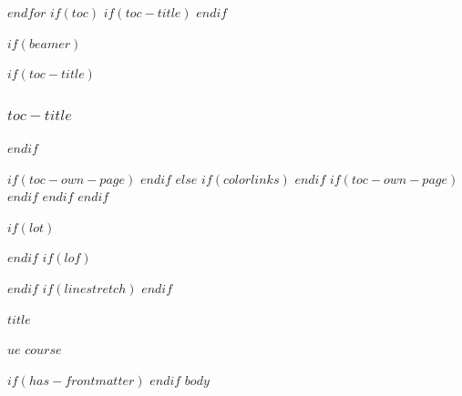 \documentclass[
$if(fontsize)$
  $fontsize$,
$endif$
$if(lang)$
  $babel-lang$,
$endif$
$if(papersize)$
  $papersize$paper,
$else$
  paper=a4,
$endif$
$if(beamer)$
  ignorenonframetext,
$if(handout)$
  handout,
$endif$
$if(aspectratio)$
  aspectratio=$aspectratio$,
$endif$
$endif$
$for(classoption)$
  $classoption$$sep$,
$endfor$
  ,captions=tableheading
]{$if(beamer)$$documentclass$$else$$if(book)$scrbook$else$scrartcl$endif$$endif$}
\begin{document}
$endfor$
$if(toc)$
$if(toc-title)$
\renewcommand*\contentsname{$toc-title$}
$endif$

$if(beamer)$
\begin{frame}[allowframebreaks]
$if(toc-title)$
  \frametitle{$toc-title$}
$endif$
  \tableofcontents[hideallsubsections]
\end{frame}
$if(toc-own-page)$
\newpage
$endif$
$else$
{
$if(colorlinks)$
\hypersetup{linkcolor=$if(toccolor)$$toccolor$$else$$endif$}
$endif$
\setcounter{tocdepth}{$toc-depth$}
\tableofcontents
$if(toc-own-page)$
\newpage
$endif$
}
$endif$
$endif$

$if(lot)$
\listoftables
$endif$
$if(lof)$
\listoffigures
$endif$
$if(linestretch)$
$endif$

\thispagestyle{firstpage}



{\Huge \bfseries $title$}\\
{\large $ue$ $course$\par}

\vspace{1mm}


$if(has-frontmatter)$
\mainmatter
$endif$
$body$
\end{document}
